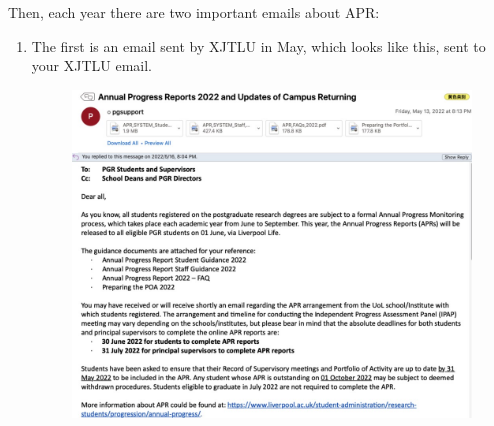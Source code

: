 Then, each year there are two important emails about APR:
\begin{enumerate}
    \item 
        \begin{minipage}{0.3\textwidth}
            The first is an email sent by XJTLU in May, which looks like this, sent to your XJTLU email.
        \end{minipage}
        \begin{minipage}{0.63\textwidth}
            \begin{figure}[H]
                \includegraphics[width=0.95\columnwidth, right]{author-folder/Kai.Wu/APR_email.jpg}
            \end{figure}
        \end{minipage}


\end{enumerate}
